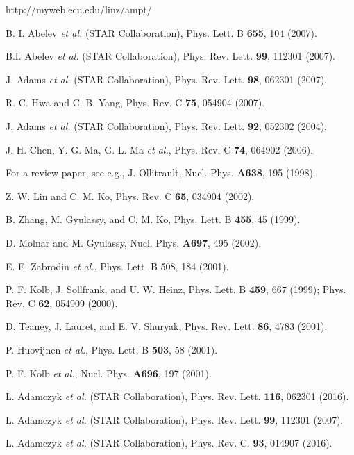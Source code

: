 \documentclass[twocolumn,aps,prc,showpacs,superscriptaddress,preprintnumbers,floatfix,nofootinbib]{revtex4}
\begin{document}
\begin{CJK*}{GBK}{song}
\begin{thebibliography}{88}
 http://myweb.ecu.edu/linz/ampt/

 B. I. Abelev {\it et al.} (STAR Collaboration), Phys. Lett. B {\bf 655}, 104 (2007).

 B.I. Abelev {\it et al.} (STAR Collaboration), Phys. Rev. Lett. {\bf 99}, 112301 (2007).

 J. Adams {\it et al.} (STAR Collaboration), Phys. Rev. Lett. {\bf 98}, 062301 (2007).

 R. C. Hwa and C. B. Yang, Phys. Rev. C {\bf 75}, 054904 (2007).

J. Adams {\it et al.} (STAR Collaboration), Phys. Rev. Lett. {\bf 92}, 052302 (2004). %

 J. H. Chen, Y. G. Ma, G. L. Ma  {\it et al.}, Phys. Rev. C {\bf 74}, 064902 (2006).

 For a review paper, see e.g., J. Ollitrault, Nucl. Phys. {\bf A638}, 195 (1998).

 Z. W. Lin and C. M. Ko, Phys. Rev. C {\bf 65}, 034904 (2002).

 B. Zhang, M. Gyulassy, and C. M. Ko, Phys. Lett. B {\bf 455}, 45 (1999).

 D. Molnar and M. Gyulassy, Nucl. Phys. {\bf A697}, 495 (2002).

 E. E. Zabrodin {\it et al.}, Phys. Lett. B {508}, 184 (2001).

 P. F. Kolb, J. Sollfrank, and U. W. Heinz, Phys. Lett. B {\bf 459}, 667 (1999); Phys. Rev. C {\bf 62}, 054909 (2000).

 D. Teaney, J. Lauret, and E. V. Shuryak, Phys. Rev. Lett. {\bf 86}, 4783 (2001).

 P. Huovijnen {\it et al.}, Phys. Lett. B {\bf 503}, 58 (2001).

 P. F. Kolb {\it et al.}, Nucl. Phys. {\bf A696}, 197 (2001).

 L. Adamczyk {\it et al.} (STAR Collaboration), Phys. Rev. Lett. {\bf 116}, 062301 (2016).

 L. Adamczyk {\it et al.} (STAR Collaboration), Phys. Rev. Lett. {\bf 99}, 112301 (2007).

 L. Adamczyk {\it et al.} (STAR Collaboration), Phys. Rev. C. {\bf 93}, 014907 (2016).

\end{thebibliography}
\end{CJK*}
\end{document}
